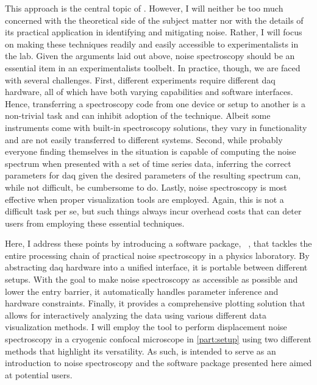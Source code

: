 This approach is the central topic of \thispart.
However, I will neither be too much concerned with the theoretical side of the subject matter nor with the details of its practical application in identifying and mitigating noise.
Rather, I will focus on making these techniques readily and easily accessible to experimentalists in the lab.
Given the arguments laid out above, noise spectroscopy should be an essential item in an experimentalists toolbelt.
In practice, though, we are faced with several challenges.
First, different experiments require different \gls{daq} hardware, all of which have both varying capabilities and software interfaces.
Hence, transferring a spectroscopy code from one device or setup to another is a non-trivial task and can inhibit adoption of the technique.
Albeit some instruments come with built-in spectroscopy solutions, they vary in functionality and are not easily transferred to different systems.
Second, while probably everyone finding themselves in the situation is capable of computing the noise spectrum when presented with a set of time series data, inferring the correct parameters for \acrlong{daq} given the desired parameters of the resulting spectrum can, while not difficult, be cumbersome to do.
Lastly, noise spectroscopy is most effective when proper visualization tools are employed.
Again, this is not a difficult task per se, but such things always incur overhead costs that can deter users from employing these essential techniques.

Here, I address these points by introducing a \python software package, \pyspeck~\cite{Hangleiter_pyspeck}, that tackles the entire processing chain of practical noise spectroscopy in a physics laboratory.
By abstracting \gls{daq} hardware into a unified interface, it is portable between different setups.
With the goal to make noise spectroscopy as accessible as possible and lower the entry barrier, it automatically handles parameter inference and hardware constraints.
Finally, it provides a comprehensive plotting solution that allows for interactively analyzing the data using various different data visualization methods.
I will employ the tool to perform displacement noise spectroscopy in a cryogenic confocal microscope in \cref{part:setup} using two different methods that highlight its versatility.
As such, \thispart is intended to serve as an introduction to noise spectroscopy and the \pyspeck software package presented here aimed at potential users.

